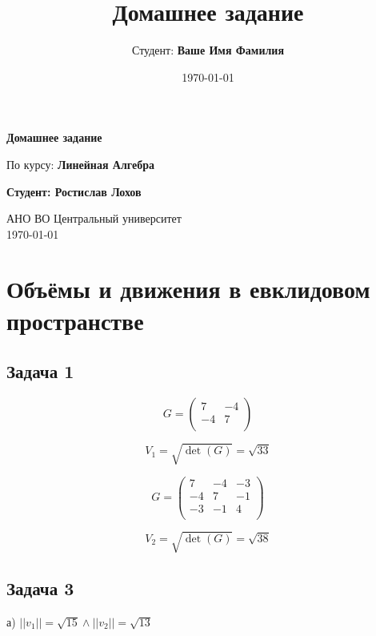 \documentclass[a4paper,12pt]{article}
\title{Домашнее задание}
\author{Студент: \textbf{Ваше Имя Фамилия}}
\date{\today}
\begin{document}
\begin{titlepage}
    \centering
    \vspace*{1cm}

    \Huge
    \textbf{Домашнее задание}

    \vspace{0.5cm}
    \LARGE
    По курсу: \textbf{Линейная Алгебра}

    \vspace{1.5cm}

    \textbf{Студент: Ростислав Лохов}

    \vfill

    \Large
    АНО ВО Центральный университет\\
    \vspace{0.3cm}
    \today

\end{titlepage}

\tableofcontents
\newpage

\section{Объёмы и движения в евклидовом пространстве}

\subsection{Задача 1}

\[
G = \begin{pmatrix}
    7 & -4 \\
    -4 & 7 \\
\end{pmatrix}
\]

\[
V_1 = \sqrt{\det(G)} = \sqrt{33}
\]

\[
G = \begin{pmatrix}
    7 & -4 & -3 \\
    -4 & 7 & -1 \\
    -3 & -1 & 4 \\
\end{pmatrix}
\]

\[
V_2 = \sqrt{\det(G)} = \sqrt{38}
\]

\subsection{Задача 3}

а) \( ||v_1|| = \sqrt{15} \land ||v_2|| = \sqrt{13} \)
\end{document}
